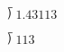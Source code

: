 \documentclass{article}
\begin{document}
$\longdivision{1.431}{13}$

$\longdivision{1}{13}$
\end{document}
